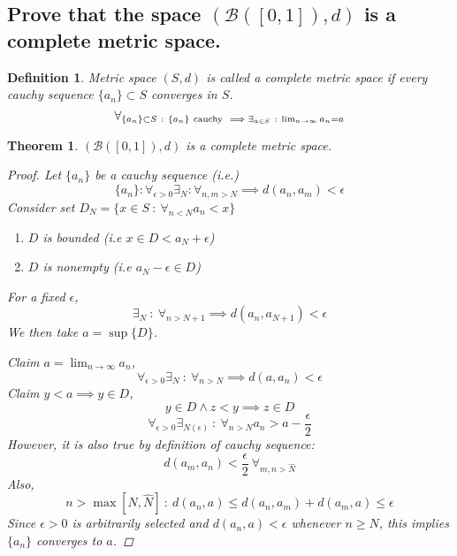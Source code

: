 \documentclass[]{article}
\newcommand{\st}{\ : \ }
\newtheorem{definition}{Definition}
\newtheorem{theorem}{Theorem}
\begin{document}






\newpage
\subsection{Prove that the space $(\mathcal{B}([0,1]),d)$ is a complete metric space.}
\begin{definition}
    Metric space $(S,d)$ is called a \emph{complete metric space} if every cauchy sequence $\{a_n\}\subset S$ converges in $S$.
    \[\forall_{\{a_n\}\subset S \st \{a_n\} \ \textnormal{cauchy} \ \implies \exists_{a \in S} \st \lim_{n\to\infty} a_n = a}\]
\end{definition}
\begin{theorem}
    $(\mathcal{B}([0,1]),d)$ is a complete metric space.
    \begin{proof}
        Let $\{a_n\}$ be a cauchy sequence (i.e.)
        \[\{a_n\} : \forall_{\epsilon>0} \exists_{N} : \forall_{n,m > N} \implies d(a_n,a_m) < \epsilon\]
        Consider set $D_N = \{x \in S \st \forall_{n < N} a_n < x\}$
        \begin{enumerate}
            \item $D$ is bounded (i.e $x \in D < a_N + \epsilon$)
            \item $D$ is nonempty (i.e $a_N - \epsilon \in D$)
        \end{enumerate}
        For a fixed $\epsilon$, 
        \[\exists_{N} \st \forall_{n > N + 1} \implies d(a_n, a_{N+1}) < \epsilon\]
        We then take $a = \sup\{D\}$.

        Claim $a = \lim_{n\to\infty} a_n$,
        \[\forall_{\epsilon>0} \exists_N \st \forall_{n>N} \implies d(a,a_n) < \epsilon\]
        Claim $y < a \implies y \in D$,
        \[y \in D \land z < y \implies z \in D\]
        \[\forall_{\epsilon>0} \exists_{N(\epsilon)} \st \forall_{n>N} a_n > a - \frac{\epsilon}{2}\]
        However, it is also true by definition of cauchy sequence: 
        \[d(a_m, a_n) < \frac{\epsilon}{2} \ \forall_{m,n > \hat{N}}\]
        Also,
        \[n > \max[N,\hat{N}] \st d(a_n,a) \leq d(a_n,a_m) + d(a_m,a) \leq \epsilon\]
        Since $\epsilon>0$ is arbitrarily selected and $d(a_n,a) < \epsilon$ whenever $n\geq N$, this implies $\{a_n\}$ converges to $a$.
    \end{proof}
\end{theorem}

\newpage
\end{document}
